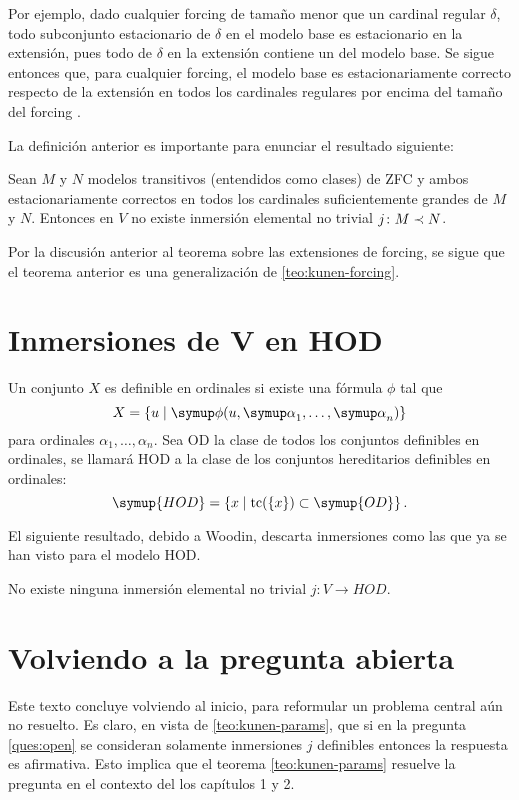 \documentclass
[
  12pt,
  letterpaper,
  openany,
  oneside,
]{book}
\begin{document}
Por ejemplo, dado cualquier forcing de tamaño menor que un cardinal regular $\delta$,
todo subconjunto estacionario de $\delta$ en el modelo base es estacionario en la extensión,
pues todo \cna{} de $\delta$ en la extensión contiene un \cna{} del modelo base.
Se sigue entonces que, para cualquier forcing, el modelo base es estacionariamente correcto
respecto de la extensión en todos los cardinales regulares por encima del tamaño del forcing
\autocite[1878]{hamkins_generalizations_2012}.

La definición anterior es importante para enunciar el resultado siguiente:

\begin{teo}
    Sean $M$ y $N$ modelos transitivos (entendidos como clases) de ZFC y ambos
    estacionariamente correctos en todos los cardinales suficientemente grandes
    de $M$ y $N$. Entonces en $V$ no existe inmersión elemental no trivial
    $j\colon M\prec N$.
\end{teo}

Por la discusión anterior al teorema sobre las extensiones de forcing,
se sigue que el teorema anterior es una generalización de \ref{teo:kunen-forcing}.

\section{Inmersiones de $\symbf{V}$ en HOD}

Un conjunto $X$ es definible en ordinales si existe una fórmula $\phi$
tal que
\[
    X = \set{u\mid \phi(u, \alpha_1,\dots,\alpha_n)}
\]
para ordinales $\alpha_1,\dots,\alpha_n$. Sea OD la clase de todos
los conjuntos definibles en ordinales, se llamará HOD a la clase de
los conjuntos hereditarios definibles en ordinales:
\[
    \symup{HOD} = \set{x\mid \tc(\set{x})\subset \symup{OD}}.
\]

El siguiente resultado, debido a Woodin, descarta inmersiones
como las que ya se han visto para el modelo HOD.

\begin{teo}
    No existe ninguna inmersión elemental no trivial $j\colon V\to HOD$.
\end{teo}

\section{Volviendo a la pregunta abierta}

Este texto concluye volviendo al inicio, para reformular un
problema central aún no resuelto.
Es claro, en vista de \ref{teo:kunen-params}, que si en la pregunta
\ref{ques:open} se consideran solamente inmersiones $j$ definibles
entonces la respuesta es afirmativa. Esto implica
que el teorema \ref{teo:kunen-params} resuelve la pregunta
en el contexto del los capítulos 1 y 2.
\end{document}
